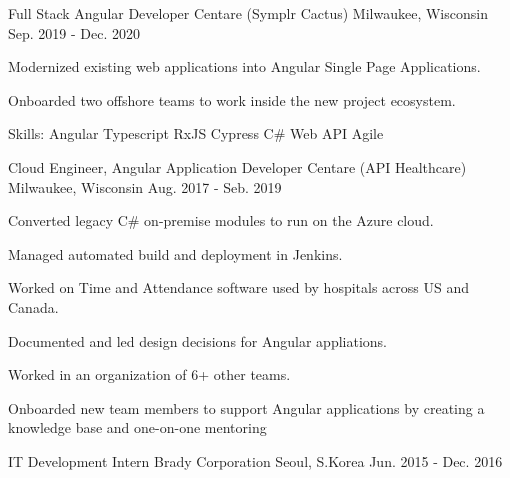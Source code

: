 \begin{cventries}
  \cventry
    {Full Stack Angular Developer} %
    {Centare (Symplr Cactus)} %
    {Milwaukee, Wisconsin} %
    {Sep. 2019 - Dec. 2020} %
    {
      \begin{cvitems} %
        \item {Modernized existing web applications into Angular Single Page Applications.}
        \item {Onboarded two offshore teams to work inside the new project ecosystem.}
        \item {Skills: Angular \textbullet{} Typescript \textbullet{} RxJS \textbullet{} Cypress \textbullet{} C\# Web API \textbullet{} Agile}
      \end{cvitems}
    }

  \cventry
    {Cloud Engineer, Angular Application Developer} %
    {Centare (API Healthcare)} %
    {Milwaukee, Wisconsin} %
    {Aug. 2017 - Seb. 2019} %
    {
      \begin{cvitems} %
        \item {Converted legacy C\# on-premise modules to run on the Azure cloud.}
        \item {Managed automated build and deployment in Jenkins.}
        \item {Worked on Time and Attendance software used by hospitals across US and Canada.}
        \item {Documented and led design decisions for Angular appliations.}
        \item {Worked in an organization of 6+ other teams.}
        \item {Onboarded new team members to support Angular applications by creating a knowledge base and one-on-one mentoring}
      \end{cvitems}
    }

  \cventry
    {IT Development Intern} %
    {Brady Corporation} %
    {Seoul, S.Korea} %
    {Jun. 2015 - Dec. 2016} %
    {
    }

\end{cventries}
